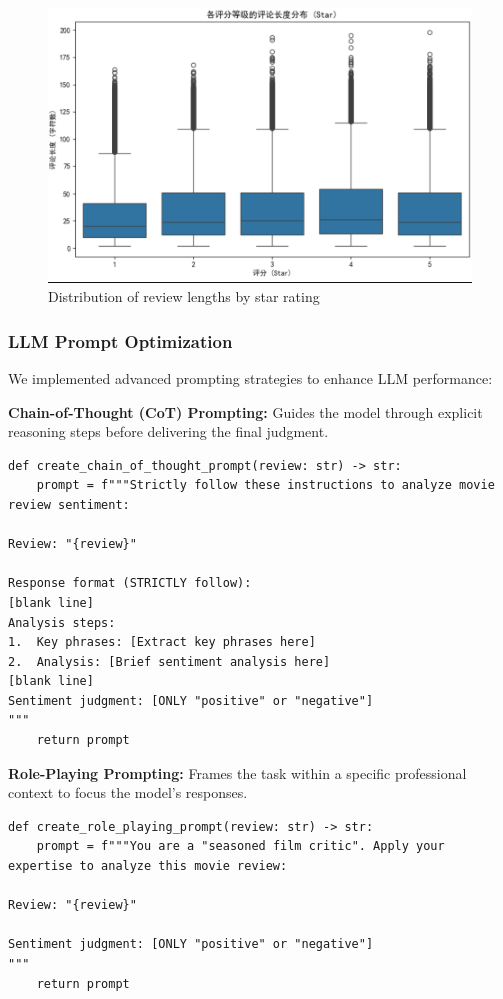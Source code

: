\documentclass{article}
\begin{document}
\begin{figure}[h]
    \centering
    \includegraphics[width=1\columnwidth]{pic/T2P2B1.3.png}
    \caption{Distribution of review lengths by star rating}
    \label{fig:length_analysis}
\end{figure}

\subsubsection{LLM Prompt Optimization}
\label{sssec:prompt_optimization}

We implemented advanced prompting strategies to enhance LLM performance:

\textbf{Chain-of-Thought (CoT) Prompting:}
Guides the model through explicit reasoning steps before delivering the final judgment.

\begin{lstlisting}[caption={Chain-of-Thought prompt design}]
def create_chain_of_thought_prompt(review: str) -> str:
    prompt = f"""Strictly follow these instructions to analyze movie review sentiment:

Review: "{review}"

Response format (STRICTLY follow):
[blank line]
Analysis steps:
1.  Key phrases: [Extract key phrases here]
2.  Analysis: [Brief sentiment analysis here]
[blank line]
Sentiment judgment: [ONLY "positive" or "negative"]
"""
    return prompt
\end{lstlisting}

\textbf{Role-Playing Prompting:}
Frames the task within a specific professional context to focus the model's responses.

\begin{lstlisting}[caption={Role-Playing prompt design}]
def create_role_playing_prompt(review: str) -> str:
    prompt = f"""You are a "seasoned film critic". Apply your expertise to analyze this movie review:

Review: "{review}"

Sentiment judgment: [ONLY "positive" or "negative"]
"""
    return prompt
\end{lstlisting}
\end{document}
